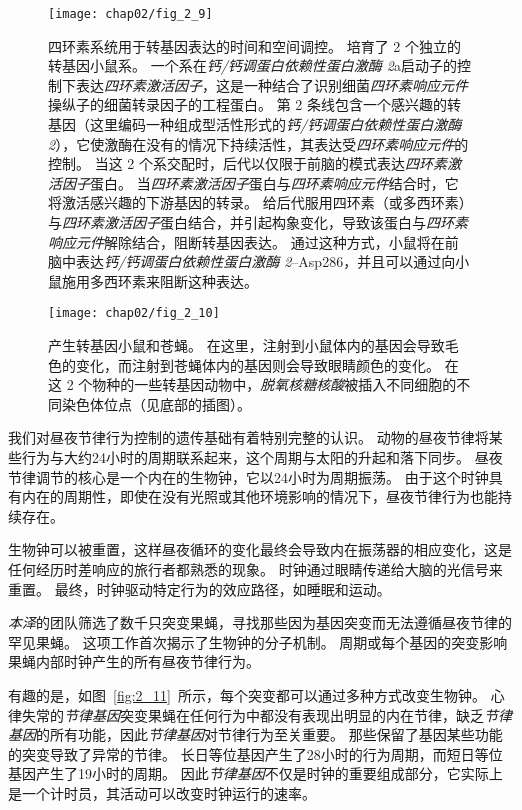 \begin{figure}[htbp]
	\centering
	\texttt{[image: chap02/fig\_2\_9]}
	\caption{四环素系统用于转基因表达的时间和空间调控。
		培育了 2 个独立的转基因小鼠系。
		一个系在\textit{钙/钙调蛋白依赖性蛋白激酶 2}a启动子的控制下表达\textit{四环素激活因子}，这是一种结合了识别细菌\textit{四环素响应元件}操纵子的细菌转录因子的工程蛋白。
		第 2 条线包含一个感兴趣的转基因（这里编码一种组成型活性形式的\textit{钙/钙调蛋白依赖性蛋白激酶 2}），它使激酶在没有的情况下持续活性，其表达受\textit{四环素响应元件}的控制。
		当这 2 个系交配时，后代以仅限于前脑的模式表达\textit{四环素激活因子}蛋白。
		当\textit{四环素激活因子}蛋白与\textit{四环素响应元件}结合时，它将激活感兴趣的下游基因的转录。
		给后代服用四环素（或多西环素）与\textit{四环素激活因子}蛋白结合，并引起构象变化，导致该蛋白与\textit{四环素响应元件}解除结合，阻断转基因表达。
		通过这种方式，小鼠将在前脑中表达\textit{钙/钙调蛋白依赖性蛋白激酶 2}–Asp286，并且可以通过向小鼠施用多西环素来阻断这种表达\cite{mayford1996control}。}
	\label{fig:2_9}
\end{figure}


\begin{figure}[htbp]
	\centering
	\texttt{[image: chap02/fig\_2\_10]}
	\caption{产生转基因小鼠和苍蝇。
		在这里，注射到小鼠体内的基因会导致毛色的变化，而注射到苍蝇体内的基因则会导致眼睛颜色的变化。
		在这 2 个物种的一些转基因动物中，\textit{脱氧核糖核酸}被插入不同细胞的不同染色体位点（见底部的插图）\cite{alberts2017molecular}。}
	\label{fig:2_10}
\end{figure}




我们对昼夜节律行为控制的遗传基础有着特别完整的认识。
动物的昼夜节律将某些行为与大约24小时的周期联系起来，这个周期与太阳的升起和落下同步。
昼夜节律调节的核心是一个内在的生物钟，它以24小时为周期振荡。
由于这个时钟具有内在的周期性，即使在没有光照或其他环境影响的情况下，昼夜节律行为也能持续存在。



生物钟可以被重置，这样昼夜循环的变化最终会导致内在振荡器的相应变化，这是任何经历时差响应的旅行者都熟悉的现象。
时钟通过眼睛传递给大脑的光信号来重置。
最终，时钟驱动特定行为的效应路径，如睡眠和运动。


\textit{本泽}的团队筛选了数千只突变果蝇，寻找那些因为基因突变而无法遵循昼夜节律的罕见果蝇。
这项工作首次揭示了生物钟的分子机制。
周期或每个基因的突变影响果蝇内部时钟产生的所有昼夜节律行为。


有趣的是，如图~\ref{fig:2_11}~所示，每个突变都可以通过多种方式改变生物钟。
心律失常的\textit{节律基因}突变果蝇在任何行为中都没有表现出明显的内在节律，缺乏\textit{节律基因}的所有功能，因此\textit{节律基因}对节律行为至关重要。
那些保留了基因某些功能的突变导致了异常的节律。
长日等位基因产生了28小时的行为周期，而短日等位基因产生了19小时的周期。
因此\textit{节律基因}不仅是时钟的重要组成部分，它实际上是一个计时员，其活动可以改变时钟运行的速率。


